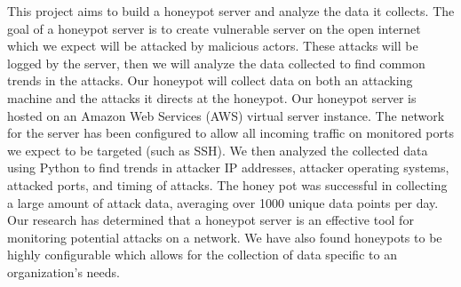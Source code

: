 This project aims to build a honeypot server and analyze the data it collects. The goal of a honeypot server is to create vulnerable server on the open internet which we expect will be attacked by malicious actors. These attacks will be logged by the server, then we will analyze the data collected to find common trends in the attacks. Our honeypot will collect data on both an attacking machine and the attacks it directs at the honeypot. Our honeypot server is hosted on an Amazon Web Services (AWS) virtual server instance. The network for the server has been configured to allow all incoming traffic on monitored ports we expect to be targeted (such as SSH). We then analyzed the collected data using Python to find trends in attacker IP addresses, attacker operating systems, attacked ports, and timing of attacks. The honey pot was successful in collecting a large amount of attack data, averaging over 1000 unique data points per day. Our research has determined that a honeypot server is an effective tool for monitoring potential attacks on a network. We have also found honeypots to be highly configurable which allows for the collection of data specific to an organization's needs. 
